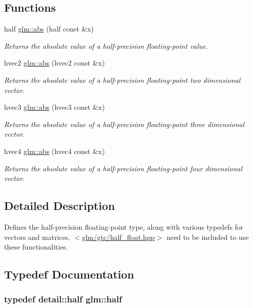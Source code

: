 \subsection*{Functions}
\begin{DoxyCompactItemize}
\item 
half \hyperlink{group__gtc__half__float_ga7baeb4a0d33ef51c77ef5b69fe5a18d3}{glm\-::abs} (half const \&x)
\begin{DoxyCompactList}\small\item\em Returns the absolute value of a half-\/precision floating-\/point value. \end{DoxyCompactList}\item 
hvec2 \hyperlink{group__gtc__half__float_ga45cfe493b84a3defa8ee522dba1db7ad}{glm\-::abs} (hvec2 const \&x)
\begin{DoxyCompactList}\small\item\em Returns the absolute value of a half-\/precision floating-\/point two dimensional vector. \end{DoxyCompactList}\item 
hvec3 \hyperlink{group__gtc__half__float_ga239a9e24147a79fb9e7ae39454258966}{glm\-::abs} (hvec3 const \&x)
\begin{DoxyCompactList}\small\item\em Returns the absolute value of a half-\/precision floating-\/point three dimensional vector. \end{DoxyCompactList}\item 
hvec4 \hyperlink{group__gtc__half__float_ga8b3b9d614c70a6b70eabb7c908f90cd6}{glm\-::abs} (hvec4 const \&x)
\begin{DoxyCompactList}\small\item\em Returns the absolute value of a half-\/precision floating-\/point four dimensional vector. \end{DoxyCompactList}\end{DoxyCompactItemize}


\subsection{Detailed Description}
Defines the half-\/precision floating-\/point type, along with various typedefs for vectors and matrices. $<$\hyperlink{half__float_8hpp}{glm/gtc/half\-\_\-float.\-hpp}$>$ need to be included to use these functionalities. 

\subsection{Typedef Documentation}
\hypertarget{group__gtc__half__float_gadae4de950aa2230455634615b782c151}{
\subsubsection[{half}]{\setlength{\rightskip}{0pt plus 5cm}typedef detail\-::half {\bf glm\-::half}}}\label{group__gtc__half__float_gadae4de950aa2230455634615b782c151}



